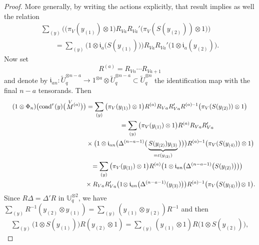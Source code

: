 \documentclass[pdftex]{sigma}%
\numberwithin{equation}{section}
\numberwithin{figure}{section}
\newcommand{\mUq}{\mathbb{U}_q}
\newcommand{\ra}{\rightarrow}
\begin{document}
\begin{proof}
More generally, by writing the actions explicitly, that result implies as well the relation
\begin{gather}
\sum_{(y)}\big(\big(\pi_V(y_{(1)}) \otimes 1\big) R_{Va}R_{Va}' \big(\pi_V( S(y_{(2)})) \otimes 1\big)\big)\nonumber
\\ \qquad
{} = \sum_{(y)} \big(1 \otimes \mathfrak{i}_{a}\big( S(y_{(1)})\big)\big) R_{Va}R_{Va}' \big(1 \otimes \mathfrak{i}_{a}(y_{(2)})\big).
\label{equivexplicit}
\end{gather}
Now set
\[R^{(a)} = R_{Vn}\cdots R_{Va+1}\]
and denote by $\mathfrak{i}_{an}\colon \tilde U_q^{{\otimes} n-a} \ra 1^{ \otimes a} \otimes\tilde U_q^{{\otimes} n-a} \subset \tilde U_q^{{\otimes} n}$ the identification map with the final $n-a$ tensorands. Then
\begin{gather*}
 (1 \otimes \Phi_n) \big(\! \operatorname{coad}^r(y) \big(\!\stackrel{V}{M}{}^{\!\! (a)}\big) \big) = \sum_{(y)}\big(\pi_V(y_{(1)}) \otimes 1\big) R^{(a)} R_{Va}R_{Va}' R^{(a)}{}^{\!-1} \big(\pi_V( S(y_{(2)})) \otimes 1\big)
 \\ \hphantom{ (1 \otimes \Phi_n) \big(\! \operatorname{coad}^r(y) \big(\!\stackrel{V}{M}{}^{\!\! (a)}\big) \big)}
{} = \sum_{(y)}\big(\pi_V(y_{(1)}) \otimes 1\big) R^{(a)} R_{Va}R_{Va}'
 \\ \hphantom{ (1 \otimes \Phi_n) \big(\! \operatorname{coad}^r(y) \big(\!\stackrel{V}{M}{}^{\!\! (a)}\big) \big)=}
{} \times\big(1 \otimes \mathfrak{i}_{an}\big(\Delta^{(n-a-1)}\big(\underbrace{ S(y_{(2)})y_{(3)}}_{=\varepsilon(y_{(2)})}\big)\big)\big) R^{(a)}{}^{\!-1} \big(\pi_V( S(y_{(4)})) \otimes 1\big)
 \\ \hphantom{ (1 \otimes \Phi_n) \big(\! \operatorname{coad}^r(y) \big(\!\stackrel{V}{M}{}^{\!\! (a)}\big) \big)}
{} = \sum_{(y)}\big(\pi_V(y_{(1)}) \otimes 1\big) R^{(a)} \big(1 \otimes \mathfrak{i}_{an}\big(\Delta^{(n-a-1)}\big( S(y_{(2)})\big)\big)\big)
 \\ \hphantom{ (1 \otimes \Phi_n) \big(\! \operatorname{coad}^r(y) \big(\!\stackrel{V}{M}{}^{\!\! (a)}\big) \big)=}
{}\times R_{Va}R_{Va}' \big(1\! \otimes \mathfrak{i}_{an}\big(\Delta^{(n-a-1)}(y_{(3)})\big)\big) R^{(a)}{}^{\!-1} \big(\pi_V\big( S(y_{(4)})\big)\! \otimes 1\big).
 \end{gather*}
Since $R \Delta = \Delta'R$ in $\mUq^{ \otimes 2}$, we have $\textstyle \sum_{(y)} R^{-1} (y_{(2)}\otimes y_{(1)}) = \sum_{(y)} (y_{(1)}\otimes y_{(2)}) R^{-1}$ and then
\begin{gather*}
\sum_{(y)} \big(1 \otimes S(y_{(1)})\big)R(y_{(2)} \otimes 1) = \sum_{(y)} (y_{(1)} \otimes 1) R \big(1 \otimes S(y_{(2)})\big),

\end{gather*}
\end{proof}
\end{document}
